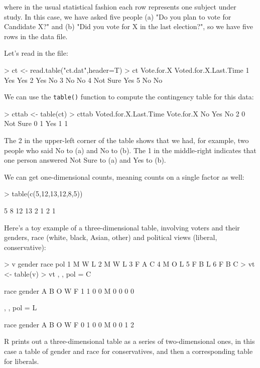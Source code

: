 \noindent
where in the usual statistical fashion each row represents one subject
under study. In this case, we have asked five people (a) "Do you
plan to vote for Candidate X?" and (b) "Did you vote for X in the last
election?", so we have five rows in the data file.  

Let's read in the file:

\begin{Code}
> ct <- read.table("ct.dat",header=T)
> ct
  Vote.for.X Voted.for.X.Last.Time
1        Yes                   Yes
2        Yes                    No
3         No                    No
4   Not Sure                   Yes
5         No                    No
\end{Code}

We can use the {\tt table()} function to compute the contingency table
for this data:

\begin{Code}
> cttab <- table(ct)
> cttab
          Voted.for.X.Last.Time
Vote.for.X No Yes
  No        2   0
  Not Sure  0   1
  Yes       1   1
\end{Code}

The 2 in the upper-left corner of the table shows that we had, for
example, two people who said No to (a) and No to (b).  The 1 in the
middle-right indicates that one person answered Not Sure to (a) and Yes
to (b).

We can get one-dimensional counts, meaning counts on a single factor as
well:

\begin{Code}
> table(c(5,12,13,12,8,5))

 5  8 12 13 
 2  1  2  1 
\end{Code}

Here's a toy example of a three-dimensional table, involving voters and
their genders, race (white, black, Asian, other) and political views
(liberal, conservative):

\begin{Code}
> v
  gender race pol
1      M    W   L
2      M    W   L
3      F    A   C
4      M    O   L
5      F    B   L
6      F    B   C
> vt <- table(v)
> vt
, , pol = C

      race
gender A B O W
     F 1 1 0 0
     M 0 0 0 0

, , pol = L

      race
gender A B O W
     F 0 1 0 0
     M 0 0 1 2
\end{Code}

R prints out a three-dimensional table as a series of two-dimensional
ones, in this case a table of gender and race for conservatives, and
then a corresponding table for liberals.

